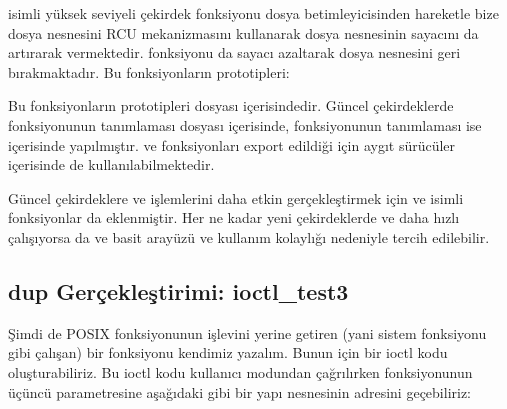 \documentclass[a4paper,10pt,turkish]{sphinxmanual}
\begin{document}
\sphinxAtStartPar
{} isimli yüksek seviyeli çekirdek fonksiyonu dosya betimleyicisinden hareketle bize dosya
nesnesini RCU mekanizmasını kullanarak dosya nesnesinin sayacını da artırarak vermektedir. 
fonksiyonu da sayacı azaltarak dosya nesnesini geri bırakmaktadır. Bu fonksiyonların prototipleri:

\begin{sphinxVerbatim}[commandchars=\\\{\}]
\end{sphinxVerbatim}

\sphinxAtStartPar
Bu fonksiyonların prototipleri  dosyası içerisindedir. Güncel çekirdeklerde
 fonksiyonunun tanımlaması  dosyası içerisinde,  fonksiyonunun
tanımlaması ise  içerisinde yapılmıştır.  ve  fonksiyonları
export edildiği için aygıt sürücüler içerisinde de kullanılabilmektedir.

\sphinxAtStartPar
Güncel çekirdeklere  ve  işlemlerini daha etkin gerçekleştirmek için  ve
 isimli fonksiyonlar da eklenmiştir. Her ne kadar yeni çekirdeklerde  ve
 daha hızlı çalışıyorsa da  ve  basit arayüzü ve kullanım kolaylığı
nedeniyle tercih edilebilir.


\subsection{dup Gerçekleştirimi: ioctl\_test3}
\label{\detokenize{filesystem1:dup-gerceklestirimi-ioctl-test3}}
\sphinxAtStartPar
Şimdi de  POSIX fonksiyonunun işlevini yerine getiren (yani  sistem fonksiyonu
gibi çalışan) bir fonksiyonu kendimiz yazalım. Bunun için bir ioctl kodu oluşturabiliriz. Bu ioctl
kodu kullanıcı modundan çağrılırken  fonksiyonunun üçüncü parametresine aşağıdaki gibi
bir yapı nesnesinin adresini geçebiliriz:
\end{document}
